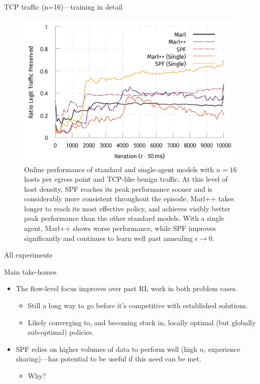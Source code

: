 \documentclass[aspectratio=169,xcolor={dvipsnames}
,hide notes
]{beamer}
\begin{document}
\begin{frame}{TCP traffic (n=16)---training in detail}
	\begin{figure}
		\centering
		\includegraphics[width=0.8\linewidth]{../plots/tcp-16-single-pres}
		
		\caption{
			Online performance of standard and single-agent models with $n=16$ hosts per egress point and TCP-like benign traffic.
			At this level of host density, SPF reaches its peak performance sooner and is considerably more consistent throughout the episode.
			Marl++ takes longer to reach its most effective policy, and achieves visibly better peak performance than the other standard models.
			With a single agent, Marl++ shows worse performance, while SPF improves significantly and continues to learn well past annealing $\epsilon \rightarrow 0$.
			\label{fig:tcp-16}
		}
	\end{figure}
\end{frame}

\begin{frame}{All experiments}
	\begin{table}
		\centering
		\caption{Average reward for combinations of model, host density and traffic class.\label{tab:av-vals}}
	\end{table}
\end{frame}

\begin{frame}{Main take-homes}
\begin{itemize}
	\item The flow-level focus \alert{improves over past RL work in both problem cases}.
	\begin{itemize}
		\item Still a long way to go before it's competitive with established solutions.
		\item Likely converging to, and becoming stuck in, locally optimal (but globally sub-optimal) policies.
	\end{itemize}
	\item SPF relies on higher volumes of data to perform well (high $n$, experience sharing)---has potential to be useful if this need can be met.
	\begin{itemize}
		\item Why?
	\end{itemize}
\end{itemize}
\end{frame}
\end{document}
